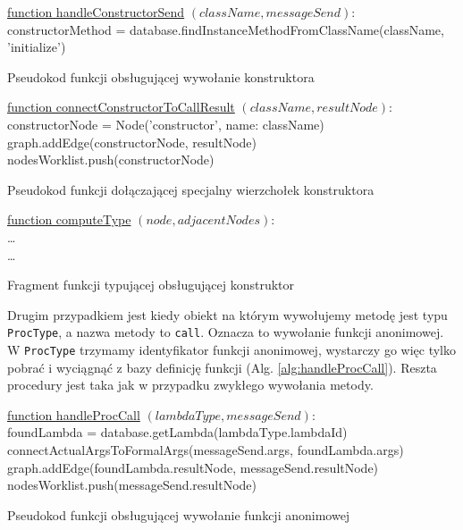 \documentclass[shortabstract,mgr]{iithesis}
\newcommand{\algsize}{\small}
\begin{document}
\begin{algorithm}
    \algsize
    \underline{function handleConstructorSend} $(\mathit{className}, \mathit{messageSend})$:\\
    constructorMethod = database.findInstanceMethodFromClassName(className, 'initialize')\;
    \caption{Pseudokod funkcji obsługującej wywołanie konstruktora}
    \label{alg:handleConstructorSend}
\end{algorithm}

\begin{algorithm}
    \algsize
    \underline{function connectConstructorToCallResult} $(\mathit{className}, \mathit{resultNode})$:\\
    constructorNode = Node('constructor', name: className)\;
    graph.addEdge(constructorNode, resultNode)\;
    nodesWorklist.push(constructorNode)\;
    \caption{Pseudokod funkcji dołączającej specjalny wierzchołek konstruktora}
    \label{alg:connectConstructorToCallResult}
\end{algorithm}

\begin{algorithm}
    \algsize
    \underline{function computeType} $(\mathit{node}, \mathit{adjacentNodes})$:\\
    \ldots\\
    \ldots
    \caption{Fragment funkcji typującej obsługującej konstruktor}
    \label{alg:computeType-constructor}
\end{algorithm}

Drugim przypadkiem jest kiedy obiekt na którym wywołujemy metodę jest typu \texttt{ProcType}, a nazwa metody to \texttt{call}. Oznacza to wywołanie funkcji anonimowej. W \texttt{ProcType} trzymamy identyfikator funkcji anonimowej, wystarczy go więc tylko pobrać i wyciągnąć z bazy definicję funkcji (Alg. \ref{alg:handleProcCall}). Reszta procedury jest taka jak w przypadku zwykłego wywołania metody.

\begin{algorithm}
    \algsize
    \underline{function handleProcCall} $(\mathit{lambdaType}, \mathit{messageSend})$:\\
    foundLambda = database.getLambda(lambdaType.lambdaId)\;
    connectActualArgsToFormalArgs(messageSend.args, foundLambda.args)\;
    graph.addEdge(foundLambda.resultNode, messageSend.resultNode)\;
    nodesWorklist.push(messageSend.resultNode)\;
    \caption{Pseudokod funkcji obsługującej wywołanie funkcji anonimowej}
    \label{alg:handleProcCall}
\end{algorithm}
\end{document}
